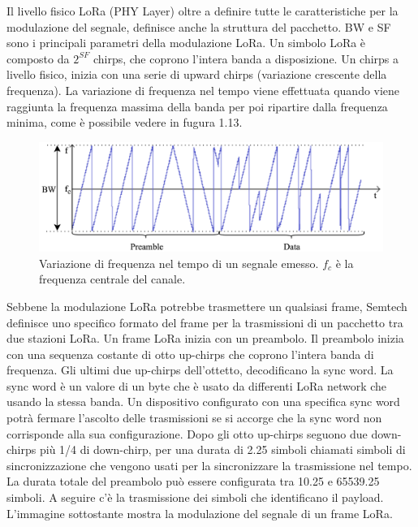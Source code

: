 \documentclass[12pt,a4paper,openright,twoside]{report}
\begin{document}
Il livello fisico LoRa (PHY Layer) oltre a definire tutte le caratteristiche per la modulazione del segnale, definisce anche la struttura del pacchetto. 
BW e SF sono i principali parametri della modulazione LoRa. Un simbolo LoRa \`e composto da $2^{SF}$ chirps, che coprono l'intera banda a disposizione. Un chirps a livello fisico, inizia con una serie di upward chirps (variazione crescente della frequenza). 
La variazione di frequenza nel tempo viene effettuata quando viene raggiunta la frequenza massima della banda per poi ripartire dalla frequenza minima, come \`e possibile vedere in fugura 1.13.


\begin{figure}[h]                      
\begin{center} 
\includegraphics[width=\textwidth]{lora_frequency_variation.png}
\caption[Variazione di frequenza nel tempo di un segnale LoRa]{ Variazione di frequenza nel tempo di un segnale emesso. $f_c$ \`e la frequenza centrale del canale.}\label{fig:prima}
\end{center}
\end{figure}

Sebbene la modulazione LoRa potrebbe trasmettere un qualsiasi frame, Semtech definisce uno specifico formato del frame per la trasmissioni di un pacchetto tra due stazioni LoRa.
Un frame LoRa inizia con un preambolo. Il preambolo inizia con una sequenza costante di otto up-chirps che coprono l'intera banda di frequenza. Gli ultimi due up-chirps dell'ottetto, decodificano la sync word. La sync word \`e un valore di un byte che \`e usato da differenti LoRa network che usando la stessa banda. Un dispositivo configurato con una specifica sync word potr\`a fermare l'ascolto delle trasmissioni se si accorge che la sync word non corrisponde alla sua configurazione. 
Dopo gli otto up-chirps seguono due down-chirps pi\`u 1/4 di down-chirp, per una durata di 2.25 simboli chiamati simboli di sincronizzazione che vengono usati per la sincronizzare la trasmissione nel tempo. La durata totale del preambolo pu\`o essere configurata tra 10.25 e 65539.25 simboli. A seguire c'\`e la trasmissione dei simboli che identificano il payload.
L'immagine sottostante mostra la modulazione del segnale di un frame LoRa.
\end{document}
